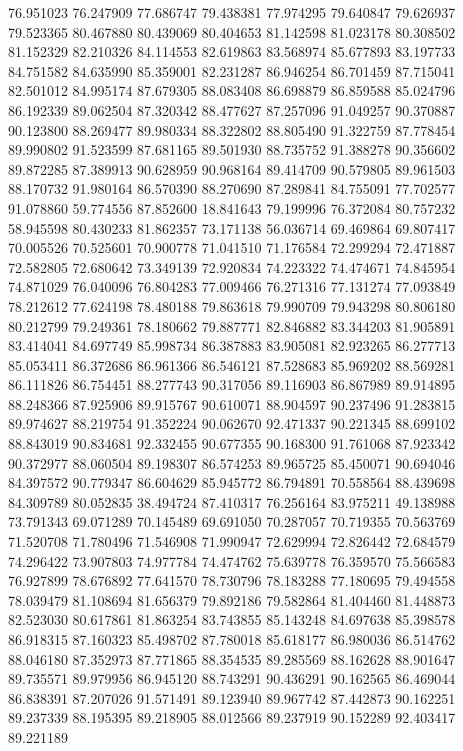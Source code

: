 76.951023
76.247909
77.686747
79.438381
77.974295
79.640847
79.626937
79.523365
80.467880
80.439069
80.404653
81.142598
81.023178
80.308502
81.152329
82.210326
84.114553
82.619863
83.568974
85.677893
83.197733
84.751582
84.635990
85.359001
82.231287
86.946254
86.701459
87.715041
82.501012
84.995174
87.679305
88.083408
86.698879
86.859588
85.024796
86.192339
89.062504
87.320342
88.477627
87.257096
91.049257
90.370887
90.123800
88.269477
89.980334
88.322802
88.805490
91.322759
87.778454
89.990802
91.523599
87.681165
89.501930
88.735752
91.388278
90.356602
89.872285
87.389913
90.628959
90.968164
89.414709
90.579805
89.961503
88.170732
91.980164
86.570390
88.270690
87.289841
84.755091
77.702577
91.078860
59.774556
87.852600
18.841643
79.199996
76.372084
80.757232
58.945598
80.430233
81.862357
73.171138
56.036714
69.469864
69.807417
70.005526
70.525601
70.900778
71.041510
71.176584
72.299294
72.471887
72.582805
72.680642
73.349139
72.920834
74.223322
74.474671
74.845954
74.871029
76.040096
76.804283
77.009466
76.271316
77.131274
77.093849
78.212612
77.624198
78.480188
79.863618
79.990709
79.943298
80.806180
80.212799
79.249361
78.180662
79.887771
82.846882
83.344203
81.905891
83.414041
84.697749
85.998734
86.387883
83.905081
82.923265
86.277713
85.053411
86.372686
86.961366
86.546121
87.528683
85.969202
88.569281
86.111826
86.754451
88.277743
90.317056
89.116903
86.867989
89.914895
88.248366
87.925906
89.915767
90.610071
88.904597
90.237496
91.283815
89.974627
88.219754
91.352224
90.062670
92.471337
90.221345
88.699102
88.843019
90.834681
92.332455
90.677355
90.168300
91.761068
87.923342
90.372977
88.060504
89.198307
86.574253
89.965725
85.450071
90.694046
84.397572
90.779347
86.604629
85.945772
86.794891
70.558564
88.439698
84.309789
80.052835
38.494724
87.410317
76.256164
83.975211
49.138988
73.791343
69.071289
70.145489
69.691050
70.287057
70.719355
70.563769
71.520708
71.780496
71.546908
71.990947
72.629994
72.826442
72.684579
74.296422
73.907803
74.977784
74.474762
75.639778
76.359570
75.566583
76.927899
78.676892
77.641570
78.730796
78.183288
77.180695
79.494558
78.039479
81.108694
81.656379
79.892186
79.582864
81.404460
81.448873
82.523030
80.617861
81.863254
83.743855
85.143248
84.697638
85.398578
86.918315
87.160323
85.498702
87.780018
85.618177
86.980036
86.514762
88.046180
87.352973
87.771865
88.354535
89.285569
88.162628
88.901647
89.735571
89.979956
86.945120
88.743291
90.436291
90.162565
86.469044
86.838391
87.207026
91.571491
89.123940
89.967742
87.442873
90.162251
89.237339
88.195395
89.218905
88.012566
89.237919
90.152289
92.403417
89.221189
